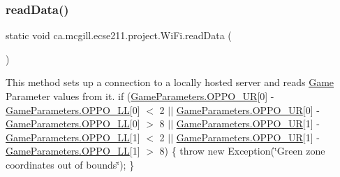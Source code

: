 \subsubsection{\texorpdfstring{read\+Data()}{readData()}}
{\footnotesize\ttfamily static void ca.\+mcgill.\+ecse211.\+project.\+Wi\+Fi.\+read\+Data (\begin{DoxyParamCaption}{ }\end{DoxyParamCaption})\hspace{0.3cm}{\ttfamily [static]}}

This method sets up a connection to a locally hosted server and reads \hyperlink{enumca_1_1mcgill_1_1ecse211_1_1project_1_1_game}{Game} Parameter values from it. if (\hyperlink{enumca_1_1mcgill_1_1ecse211_1_1project_1_1_game_parameters_a4b23cfeb18fdeecaeecb59280a455170}{Game\+Parameters.\+O\+P\+P\+O\+\_\+\+UR}\mbox{[}0\mbox{]} -\/ \hyperlink{enumca_1_1mcgill_1_1ecse211_1_1project_1_1_game_parameters_a7ae1bf6f8937b8098396452d8b30e423}{Game\+Parameters.\+O\+P\+P\+O\+\_\+\+LL}\mbox{[}0\mbox{]} $<$ 2 $\vert$$\vert$ \hyperlink{enumca_1_1mcgill_1_1ecse211_1_1project_1_1_game_parameters_a4b23cfeb18fdeecaeecb59280a455170}{Game\+Parameters.\+O\+P\+P\+O\+\_\+\+UR}\mbox{[}0\mbox{]} -\/ \hyperlink{enumca_1_1mcgill_1_1ecse211_1_1project_1_1_game_parameters_a7ae1bf6f8937b8098396452d8b30e423}{Game\+Parameters.\+O\+P\+P\+O\+\_\+\+LL}\mbox{[}0\mbox{]} $>$ 8 $\vert$$\vert$ \hyperlink{enumca_1_1mcgill_1_1ecse211_1_1project_1_1_game_parameters_a4b23cfeb18fdeecaeecb59280a455170}{Game\+Parameters.\+O\+P\+P\+O\+\_\+\+UR}\mbox{[}1\mbox{]} -\/ \hyperlink{enumca_1_1mcgill_1_1ecse211_1_1project_1_1_game_parameters_a7ae1bf6f8937b8098396452d8b30e423}{Game\+Parameters.\+O\+P\+P\+O\+\_\+\+LL}\mbox{[}1\mbox{]} $<$ 2 $\vert$$\vert$ \hyperlink{enumca_1_1mcgill_1_1ecse211_1_1project_1_1_game_parameters_a4b23cfeb18fdeecaeecb59280a455170}{Game\+Parameters.\+O\+P\+P\+O\+\_\+\+UR}\mbox{[}1\mbox{]} -\/ \hyperlink{enumca_1_1mcgill_1_1ecse211_1_1project_1_1_game_parameters_a7ae1bf6f8937b8098396452d8b30e423}{Game\+Parameters.\+O\+P\+P\+O\+\_\+\+LL}\mbox{[}1\mbox{]} $>$ 8) \{ throw new Exception(\char`\"{}\+Green zone coordinates out of bounds\char`\"{}); \}


